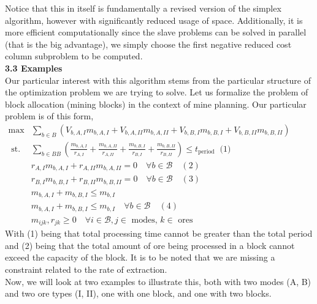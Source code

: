 \documentclass[11pt]{article}
\begin{document}
\noindent Notice that this in itself is fundamentally a revised version of the simplex algorithm, however with significantly reduced usage of space. Additionally, it is more efficient computationally since the slave problems can be solved in parallel (that is the big advantage), we simply choose the first negative reduced cost column subproblem to be computed.
\\

\noindent \textbf{3.3 Examples}
\\

\noindent Our particular interest with this algorithm stems from the particular structure of the optimization problem we are trying to solve. Let us formalize the problem of block allocation (mining blocks) in the context of mine planning. Our particular problem is of this form, 
\\

$\begin{aligned} 
    \max & \sum_{b \in B}\left(V_{b, A, I} m_{b, A, I}+V_{b, A, II} m_{b, A, II}+V_{b, B, I} m_{b, B, I}+V_{b, B, II} m_{b, B, II}\right) \\ 
    \text { st. } & \sum_{b \in B B}\left(\frac{m_{b, A, I}}{r_{A, I}}+\frac{m_{b, A, II}}{r_{A, II}}+\frac{m_{b, B, I}}{r_{B, I}}+\frac{m_{b, B, II}}{r_{B, II}}\right) \leqslant t_{\text {period }} \text { (1) } \\
    & r_{A,I} m_{b, A, I} + r_{A,II} m_{b, A, II} =0 \quad \forall b \in \mathcal{B} \quad(2) \\
    & r_{B,I} m_{b, B, I} + r_{B,II} m_{b, B, II} =0 \quad \forall b \in \mathcal{B} \quad(3) \\
    & m_{b, A, I}+m_{b, B, I} \leqslant m_{b, I}  \\ 
    & m_{b, A, I}+m_{b, B, I} \leqslant m_{b, I}  \quad \forall b \in \mathcal{B} \quad(4) \\ 
    & m_{i j k}, r_{j k} \geqslant 0 \quad \forall i \in \mathcal{B}, j \in \text { modes, } k \in \text { ores }
\end{aligned}$
\\

\noindent With (1) being that total processing time cannot be greater than the total period and (2) being that the total amount of ore being processed in a block cannot exceed the capacity of the block. It is to be noted that we are missing a constraint related to the rate of extraction.
\\

\noindent Now, we will look at two examples to illustrate this, both with two modes (A, B) and two ore types (I, II), one with one block, and one with two blocks. 
\\
\end{document}

